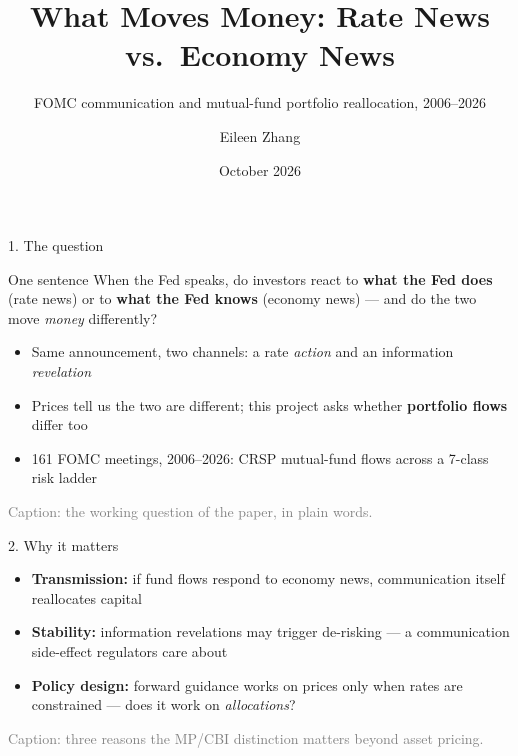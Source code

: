 \documentclass[aspectratio=169, 11pt]{beamer}
\title[Rate News vs.\ Economy News]{What Moves Money: Rate News vs.\ Economy News}
\subtitle{FOMC communication and mutual-fund portfolio reallocation, 2006--2026}
\author{Eileen Zhang}
\institute{Research Proposal --- working draft for discussion}
\date{October 2026}
\newenvironment{ablock}[1]{\begin{block}{#1}}{\end{block}}
\begin{document}
\begin{frame}{1. The question}
  \begin{ablock}{One sentence}
    When the Fed speaks, do investors react to \textbf{what the Fed does} (rate news) or to
    \textbf{what the Fed knows} (economy news) --- and do the two move \emph{money} differently?
  \end{ablock}
  \vspace{0.4em}
  \begin{itemize}
    \item Same announcement, two channels: a rate \emph{action} and an information \emph{revelation}
    \item Prices tell us the two are different; this project asks whether \textbf{portfolio flows} differ too
    \item 161 FOMC meetings, 2006--2026: CRSP mutual-fund flows across a 7-class risk ladder
  \end{itemize}
  \vspace{0.2em}
  {\scriptsize\textcolor{gray}{Caption: the working question of the paper, in plain words.}}
\end{frame}

\begin{frame}{2. Why it matters}
  \begin{itemize}
    \item \textbf{Transmission:} if fund flows respond to economy news, communication itself reallocates capital
    \item \textbf{Stability:} information revelations may trigger de-risking --- a communication side-effect regulators care about
    \item \textbf{Policy design:} forward guidance works on prices only when rates are constrained --- does it work on \emph{allocations}?
  \end{itemize}
  {\scriptsize\textcolor{gray}{Caption: three reasons the MP/CBI distinction matters beyond asset pricing.}}
\end{frame}
\end{document}
